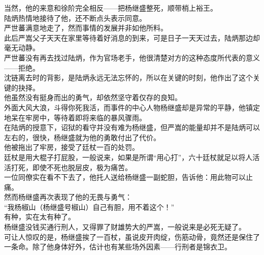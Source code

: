 \begin{multicols}{\theparacolNo}
当然，他的来意和徐阶完全相反——把杨继盛整死，顺带梢上裕王。\\

陆炳热情地接待了他，还不断点头表示同意。\\

严世蕃满意地走了，然而事情的发展并非如他所料。\\

此后严嵩父子天天在家里等待着好消息的到来，可是日子一天天过去，陆炳那边却毫无动静。\\

严世蕃没有再去找过陆炳，作为官场老手，他很清楚对方的这种态度所代表的意义——拒绝。\\

沈链离去时的背影，是陆炳永远无法忘怀的，所以在关键的时刻，他作出了这个关键的抉择。\\

他虽然没有挺身而出的勇气，却依然坚守着仅存的良知。\\

外面大风大浪，斗得你死我活，而事件的中心人物杨继盛却是异常的平静，他镇定地呆在牢房中，等待着即将来临的暴风骤雨。\\

在陆炳的授意下，诏狱的看守并没有难为杨继盛，但严嵩的能量却并不是陆炳可以左右的，很快，杨继盛就为他的勇敢付出了代价。\\

他被拖出了牢房，接受了廷杖一百的处罚。\\

廷杖是用大棍子打屁股，一般说来，如果是所谓“用心打”，六十廷杖就足以将人活活打死，即使不死也脱层皮，极为痛苦。\\

一位同僚实在看不下去了，他托人送给杨继盛一副蛇胆，告诉他：用此物可以止痛。\\

然而杨继盛再次表现了他的无畏与勇气：\\

“我杨椒山（杨继盛号椒山）自己有胆，用不着这个！”\\

有种，实在太有种了。\\

杨继盛没钱买通行刑人，又得罪了财雄势大的严嵩，一般说来是必死无疑了。\\

可让人惊叹的是，杨继盛挨了一百杖，虽说皮开肉绽，伤筋动骨，竟然还是保住了一条命。除了他身体好外，估计也有某些场外因素——行刑者是锦衣卫。\\


\end{multicols}
